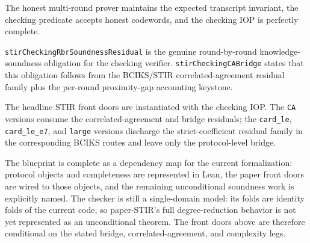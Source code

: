 \begin{theorem}\label{thm:stir_checking_completeness}
    The honest multi-round prover maintains the expected transcript invariant, the checking
    predicate accepts honest codewords, and the checking IOP is perfectly complete.
\end{theorem}

\begin{definition}\label{def:stir_checking_residuals}
    \texttt{stirCheckingRbrSoundnessResidual} is the genuine round-by-round knowledge-soundness
    obligation for the checking verifier.  \texttt{stirCheckingCABridge} states that this
    obligation follows from the BCIKS/STIR correlated-agreement residual family plus the
    per-round proximity-gap accounting keystone.
\end{definition}

\begin{theorem}\label{thm:stir_checking_front_doors}
    The headline STIR front doors are instantiated with the checking IOP.  The \texttt{CA}
    versions consume the correlated-agreement and bridge residuals; the \texttt{card\_le},
    \texttt{card\_le\_e7}, and \texttt{large} versions discharge the strict-coefficient
    residual family in the corresponding BCIKS routes and leave only the protocol-level bridge.
\end{theorem}

\begin{remark}\label{rem:stir_status}
    The blueprint is complete as a dependency map for the current formalization: protocol
    objects and completeness are represented in Lean, the paper front doors are wired to those
    objects, and the remaining unconditional soundness work is explicitly named.  The checker is
    still a single-domain model: its folds are identity folds of the current code, so paper-STIR's
    full degree-reduction behavior is not yet represented as an unconditional theorem.  The
    front doors above are therefore conditional on the stated bridge, correlated-agreement, and
    complexity legs.
\end{remark}
